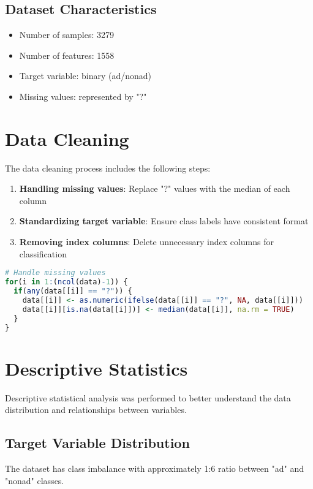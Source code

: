 \documentclass[twoside,final]{hcmut-report}
\begin{document}
\subsection{Dataset Characteristics}
\begin{itemize}
  \item Number of samples: 3279
  \item Number of features: 1558
  \item Target variable: binary (ad/nonad)
  \item Missing values: represented by "?"
\end{itemize}

\section{Data Cleaning}
\label{sec:data-cleaning}

The data cleaning process includes the following steps:

\begin{enumerate}
  \item \textbf{Handling missing values}: Replace "?" values with the median of each column
  \item \textbf{Standardizing target variable}: Ensure class labels have consistent format
  \item \textbf{Removing index columns}: Delete unnecessary index columns for classification
\end{enumerate}

\begin{lstlisting}[language=R, caption={R code for data cleaning}, label={lst:data-cleaning}]
# Handle missing values
for(i in 1:(ncol(data)-1)) {
  if(any(data[[i]] == "?")) {
    data[[i]] <- as.numeric(ifelse(data[[i]] == "?", NA, data[[i]]))
    data[[i]][is.na(data[[i]])] <- median(data[[i]], na.rm = TRUE)
  }
}
\end{lstlisting}

\section{Descriptive Statistics}
\label{sec:descriptive-statistics}

Descriptive statistical analysis was performed to better understand the data distribution and relationships between variables.

\subsection{Target Variable Distribution}
The dataset has class imbalance with approximately 1:6 ratio between "ad" and "nonad" classes.
\end{document}
